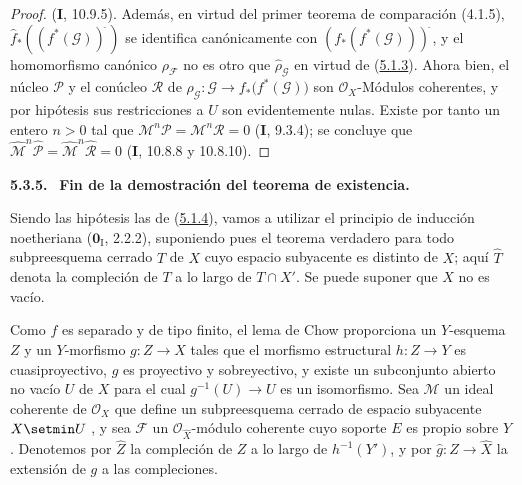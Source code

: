 \begin{proof}
(\textbf{I}, 10.9.5). Además, en virtud del primer teorema de comparación (4.1.5),
$\widehat f_*((f^*(\mathcal G))^{\widehat{\,}})$ se identifica canónicamente con
$(f_*(f^*(\mathcal G)))^{\widehat{\,}}$,
y el homomorfismo canónico $\rho_{\mathcal F}$ no es otro que
$\widehat{\rho}_{\mathcal G}$ en virtud de
(\hyperref[III.5.1.3-fr]{5.1.3}). Ahora bien, el núcleo $\mathcal P$ y el conúcleo
$\mathcal R$ de
$\rho_{\mathcal G}:\mathcal G\longrightarrow f_*\bigl(f^*(\mathcal G)\bigr)$
son $\mathcal O_X$-Módulos coherentes, y por hipótesis sus restricciones a
$U$ son evidentemente nulas. Existe por tanto un entero $n>0$ tal que
$\mathcal M^n\mathcal P=\mathcal M^n\mathcal R=0$ (\textbf{I}, 9.3.4); se concluye que
$\widehat{\mathcal M}^{n}\widehat{\mathcal P}=
\widehat{\mathcal M}^{n}\widehat{\mathcal R}=0$
(\textbf{I}, 10.8.8 y 10.8.10).
\end{proof}

\par\medskip\noindent\textbf{5.3.5.}\ \label{III.5.3.5-fr}
\textbf{Fin de la demostración del teorema de existencia.}

Siendo las hipótesis las de (\hyperref[III.5.1.4-fr]{5.1.4}), vamos a
utilizar el principio de inducción noetheriana ($\mathbf{0}_{\mathrm I}$, 2.2.2), suponiendo
pues el teorema verdadero para todo subpreesquema cerrado $T$ de $X$ cuyo espacio subyacente es distinto
de $X$; aquí $\widehat T$ denota la compleción de $T$ a lo largo de
$T\cap X'$. Se puede suponer que $X$ no es vacío.

Como $f$ es separado y de tipo finito, el lema de Chow
 proporciona un $Y$-esquema $Z$ y un $Y$-morfismo
$g:Z\to X$ tales que el morfismo estructural $h:Z\to Y$ es
cuasiproyectivo, $g$ es proyectivo y sobreyectivo, y existe un
subconjunto abierto no vacío $U$ de $X$ para el cual
$g^{-1}(U)\to U$ es un isomorfismo. Sea $\mathcal M$ un ideal coherente
de $\mathcal O_X$ que define un subpreesquema cerrado de espacio subyacente
$X\setmin U$ , y sea $\mathcal F$ un
$\mathcal O_{\widehat X}$-módulo coherente cuyo soporte $E$ es propio sobre $Y$.
Denotemos por $\widehat Z$ la compleción de $Z$ a lo largo de
$h^{-1}(Y')$, y por
$\widehat g:\widehat Z\to\widehat X$ la extensión de $g$ a
las compleciones.

